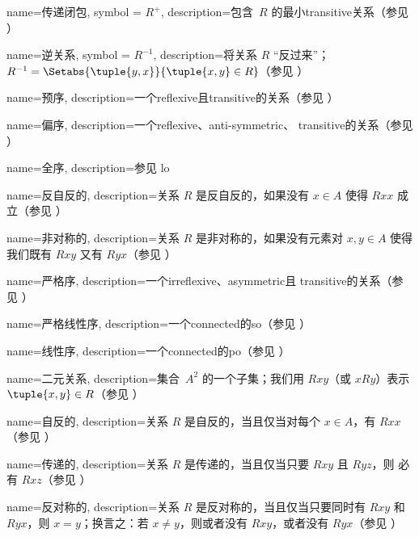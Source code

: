  {
  name=传递闭包,
  symbol = {\ensuremath{R^+}},
  description={包含~$R$ 的最小\gls{transitive}关系（参见 ）} }

 {
  name=逆关系,
  symbol = {\ensuremath{R^{-1}}},  
  description={将关系 $R$ “反过来”；$R^{-1} =
    \Setabs{\tuple{y, x}}{\tuple{x, y} \in R}$（参见
    ）} }

 {
  name=预序,
  description={一个\gls{reflexive}且\gls{transitive}的关系（参见
    ）} }

 {
  name=偏序,
  description={一个\gls{reflexive}、\gls{anti-symmetric}、
    \gls{transitive}的关系（参见 ）} }

 {
  name=全序,
  description={参见 \gls{lo}}}

 {
  name=反自反的,
  description={关系 $R$ 是反自反的，如果没有 $x \in A$ 使得 $Rxx$ 成立（参见
    ）} }

 {
  name=非对称的,
  description={关系 $R$ 是非对称的，如果没有元素对 $x,y\in A$ 使得我们既有
    $Rxy$ 又有 $Ryx$（参见 ）} }

 {
  name=严格序,
  description={一个\gls{irreflexive}、\gls{asymmetric}且
    \gls{transitive}的关系（参见 ）} }

 {
  name=严格线性序,
  description={一个\gls{connected}的\gls{so}（参见
    ）} }

 {
  name=线性序,
  description={一个\gls{connected}的\gls{po}（参见
    ）} }

 {
  name=二元关系,
  description={集合~$A^{2}$ 的一个子集；我们用 $Rxy$（或 $xRy$）表示
    $\tuple{x, y} \in R$（参见 ）} }

 {
  name=自反的,
  description={关系 $R$ 是自反的，当且仅当对每个 $x \in A$，有 $Rxx$（参见
    ）} }

 {
  name=传递的,
  description={关系 $R$ 是传递的，当且仅当只要 $Rxy$ 且 $Ryz$，则
    必有 $Rxz$（参见 ）} }

 {
  name=反对称的,
  description={关系 $R$ 是反对称的，当且仅当只要同时有 $Rxy$ 和
    $Ryx$，则 $x=y$；换言之：若 $x\neq y$，则或者没有 $Rxy$，或者没有 $Ryx$（参见 ）} }

